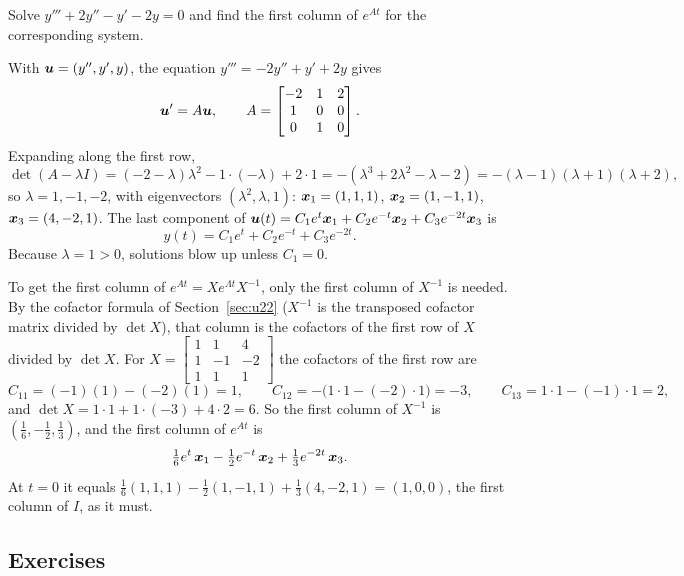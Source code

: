 \begin{example}\label{ex:u25-third}
Solve $y'''+2y''-y'-2y=0$ and find the first column of $e^{At}$ for the corresponding
system.

With $\boldsymbol{u}=(y'',y',y)$, the equation $y'''=-2y''+y'+2y$ gives
\[
  \boldsymbol{u}'=A\boldsymbol{u},\qquad A=\begin{bmatrix} -2&1&2\\ 1&0&0\\ 0&1&0\end{bmatrix}.
\]
Expanding along the first row,
\[
  \det(A-\lambda I)=(-2-\lambda)\lambda^{2}-1\cdot(-\lambda)+2\cdot1
  =-(\lambda^{3}+2\lambda^{2}-\lambda-2)=-(\lambda-1)(\lambda+1)(\lambda+2),
\]
so $\lambda=1,-1,-2$, with eigenvectors $(\lambda^{2},\lambda,1)$:
$\boldsymbol{x}_1=(1,1,1)$, $\boldsymbol{x}_2=(1,-1,1)$, $\boldsymbol{x}_3=(4,-2,1)$. The last component of
$\boldsymbol{u}(t)=C_1e^{t}\boldsymbol{x}_1+C_2e^{-t}\boldsymbol{x}_2+C_3e^{-2t}\boldsymbol{x}_3$ is
\[
  y(t)=C_1e^{t}+C_2e^{-t}+C_3e^{-2t}.
\]
Because $\lambda=1>0$, solutions blow up unless $C_1=0$.

To get the first column of $e^{At}=Xe^{\Lambda t}X^{-1}$, only the first column of
$X^{-1}$ is needed. By the cofactor formula of Section~\ref{sec:u22} ($X^{-1}$ is the transposed cofactor matrix divided by $\det X$), that column is the cofactors of the
first row of $X$ divided by $\det X$. For
$X=\left[\begin{smallmatrix} 1&1&4\\ 1&-1&-2\\ 1&1&1\end{smallmatrix}\right]$ the cofactors
of the first row are
\[
  C_{11}=(-1)(1)-(-2)(1)=1,\qquad C_{12}=-\bigl(1\cdot1-(-2)\cdot1\bigr)=-3,\qquad
  C_{13}=1\cdot1-(-1)\cdot1=2,
\]
and $\det X=1\cdot1+1\cdot(-3)+4\cdot2=6$. So the first column of $X^{-1}$ is
$(\tfrac16,-\tfrac12,\tfrac13)$, and the first column of $e^{At}$ is
\[
  \tfrac16e^{t}\,\boldsymbol{x}_1-\tfrac12e^{-t}\,\boldsymbol{x}_2+\tfrac13e^{-2t}\,\boldsymbol{x}_3 .
\]
At $t=0$ it equals $\tfrac16(1,1,1)-\tfrac12(1,-1,1)+\tfrac13(4,-2,1)=(1,0,0)$, the first
column of $I$, as it must.
\end{example}

\subsection{Exercises}

